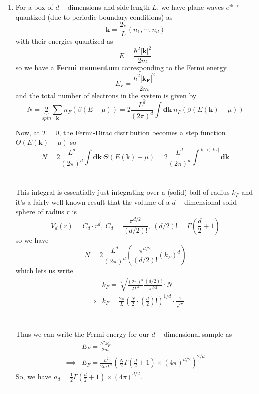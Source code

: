 \documentclass[11pt]{article}
\begin{document}
\begin{enumerate}[label=(\alph*)]
  \item For a box of $d-$dimensions and side-length $L$, we have plane-waves $e^{i\mathbf{k}\cdot\mathbf{r}}$ quantized (due to periodic boundary conditions) as $$ \mathbf{k} = \frac{2\pi}{L} \left(n_1, \cdots, n_d\right) $$  with their energies quantized as $$ E = \frac{\hbar^2|\mathbf{k}|^2}{2m} $$ so we have a \textbf{Fermi momentum} corresponding to the Fermi energy $$ E_F = \frac{\hbar^2|\mathbf{k_F}|^2}{2m} $$ and the total number of electrons in the system is given by $$ N = \underbrace{2}_{spin} \sum_{\mathbf{k}} n_{F}\left(\beta(E-\mu)\right) = 2 \frac{L^d}{(2\pi)^d} \int \mathbf{dk} ~ n_{F}\left(\beta(E(\mathbf{k})-\mu)\right) $$
  
  Now, at $T = 0$, the Fermi-Dirac distribution becomes a step function $\Theta(E(\mathbf{k}) - \mu)$ so $$ N = 2 \frac{L^d}{(2\pi)^d} \int \mathbf{dk}~\Theta(E(\mathbf{k}) - \mu) = 2 \frac{L^d}{(2\pi)^d} \int^{|k| < |k_F|} \mathbf{dk} $$\\
  \\ 
  This integral is essentially just integrating over a (solid) ball of radius $k_F$ and it's a fairly well known result that the volume of a $d-$dimensional solid sphere of radius $r$ is $$ V_d(r) = C_d \cdot r^d,~C_d = \frac{\pi^{d/2}}{(d/2)!},~(d/2)! = \Gamma(\frac{d}{2} + 1) $$ so we have $$ N = 2 \frac{L^d}{(2\pi)^d} \left( \frac{\pi^{d/2}}{(d/2)!} (k_F)^d \right) $$ which lets us write 
  \begin{align*}
    &k_F = \sqrt[d]{\frac{(2\pi)^d}{2L^d} \frac{(d/2)!}{\pi^{d/2}} \cdot N } \\ 
    \implies&k_F = \frac{2\pi}{L} \left( \frac{N}{2} \cdot \left(\frac{d}{2}\right)!\right)^{1/d} \cdot \frac{1}{\sqrt{\pi}} 
  \end{align*} \\
  \\
  Thus we can write the Fermi energy for our $d-$dimensional sample as 
  \begin{align*}
    &E_F = \frac{\hbar^2 k_F^2}{2m} \\
    \implies & \boxed{E_F = \frac{\hbar^2}{2mL^2} \left( \frac{N}{2} \Gamma\left(\frac{d}{2} + 1\right) \times (4\pi)^{d/2} \right)^{2/d} } 
  \end{align*} 
  \vskip 0.5cm
  So, we have $a_d = \frac{1}{2} \Gamma\left( \frac{d}{2} + 1 \right) \times (4\pi)^{d/2}$.
\end{enumerate}


\vskip 0.5cm
\hrule
\pagebreak
\end{document}
